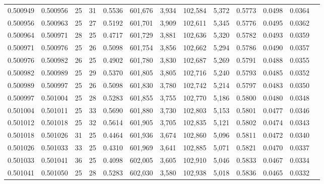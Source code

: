 \begin{tabular}{rrrrrrrrrrrrr}
0.500949 & 0.500956 &    25 &  31 &                                     0.5536 & 601,676 &   3,934 & 102,584 &   5,372 & 0.5773 & 0.0498 & 0.0364 \\
0.500956 & 0.500963 &    25 &  27 &                                     0.5192 & 601,701 &   3,909 & 102,611 &   5,345 & 0.5776 & 0.0495 & 0.0362 \\
0.500964 & 0.500971 &    28 &  25 &                                     0.4717 & 601,729 &   3,881 & 102,636 &   5,320 & 0.5782 & 0.0493 & 0.0359 \\
0.500971 & 0.500976 &    25 &  26 &                                     0.5098 & 601,754 &   3,856 & 102,662 &   5,294 & 0.5786 & 0.0490 & 0.0357 \\
0.500976 & 0.500982 &    26 &  25 &                                     0.4902 & 601,780 &   3,830 & 102,687 &   5,269 & 0.5791 & 0.0488 & 0.0355 \\
0.500982 & 0.500989 &    25 &  29 &                                     0.5370 & 601,805 &   3,805 & 102,716 &   5,240 & 0.5793 & 0.0485 & 0.0352 \\
0.500989 & 0.500997 &    25 &  26 &                                     0.5098 & 601,830 &   3,780 & 102,742 &   5,214 & 0.5797 & 0.0483 & 0.0350 \\
0.500997 & 0.501004 &    25 &  28 &                                     0.5283 & 601,855 &   3,755 & 102,770 &   5,186 & 0.5800 & 0.0480 & 0.0348 \\
0.501004 & 0.501011 &    25 &  33 &                                     0.5690 & 601,880 &   3,730 & 102,803 &   5,153 & 0.5801 & 0.0477 & 0.0346 \\
0.501012 & 0.501018 &    25 &  32 &                                     0.5614 & 601,905 &   3,705 & 102,835 &   5,121 & 0.5802 & 0.0474 & 0.0343 \\
0.501018 & 0.501026 &    31 &  25 &                                     0.4464 & 601,936 &   3,674 & 102,860 &   5,096 & 0.5811 & 0.0472 & 0.0340 \\
0.501026 & 0.501033 &    33 &  25 &                                     0.4310 & 601,969 &   3,641 & 102,885 &   5,071 & 0.5821 & 0.0470 & 0.0337 \\
0.501033 & 0.501041 &    36 &  25 &                                     0.4098 & 602,005 &   3,605 & 102,910 &   5,046 & 0.5833 & 0.0467 & 0.0334 \\
0.501041 & 0.501050 &    25 &  28 &                                     0.5283 & 602,030 &   3,580 & 102,938 &   5,018 & 0.5836 & 0.0465 & 0.0332 \\

\end{tabular}
